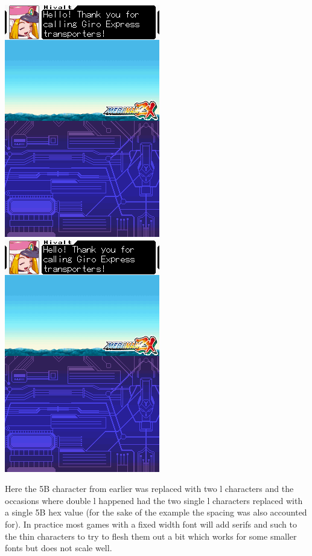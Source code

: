 \documentclass[
]{book}
\begin{document}
\includegraphics{images/108_home_fast6191_romhackingguide_unrenamed_fil___iginal_borders_romhackingguidemarkupexedit3.png}\includegraphics{images/122_home_fast6191_romhackingguide_unrenamed_fil___inal_borders_romhackingguidefontpseudoedit1.png}

Here the 5B character from earlier was replaced with two l characters and the occasions where double l happened had the two single l characters replaced with a single 5B hex value (for the sake of the example the spacing was also accounted for). In practice most games with a fixed width font will add serifs and such to the thin characters to try to flesh them out a bit which works for some smaller fonts but does not scale well.
\end{document}
